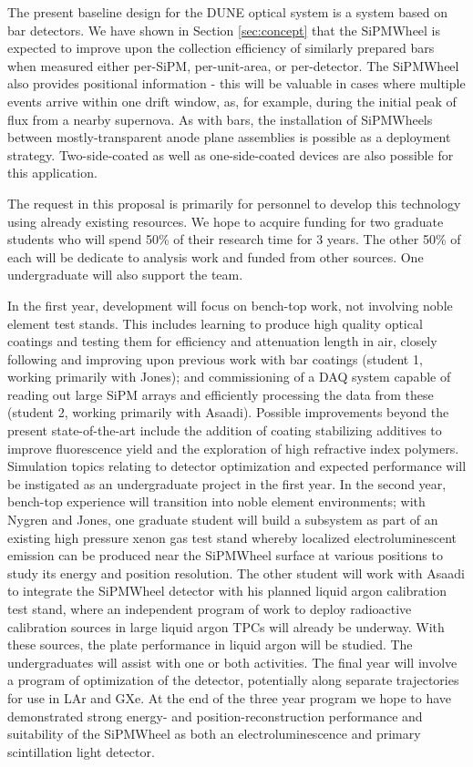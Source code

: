 The present baseline design for the DUNE optical system is a system based on bar detectors.  We have shown in Section \ref{sec:concept} that the SiPMWheel is expected to improve upon the collection efficiency of similarly prepared bars when measured either per-SiPM, per-unit-area, or per-detector.    The SiPMWheel also provides positional information - this will be valuable in cases where multiple events arrive within one drift window, as, for example, during the initial peak of flux from a nearby supernova.  As with bars, the installation of SiPMWheels between mostly-transparent anode plane assemblies is possible as a deployment strategy.   Two-side-coated as well as one-side-coated devices are also possible for this application.


The request in this proposal is primarily for personnel to develop this technology using already existing resources.  We hope to acquire funding for two graduate students who will spend 50\% of their research time for 3 years.  The other 50\% of each will be dedicate to analysis work and funded from other sources.   One undergraduate will also support the team.

In the first year, development will focus on bench-top work, not involving noble element test stands.   This includes learning to produce high quality optical coatings and testing them for efficiency and attenuation length in air, closely following and improving upon previous work with bar coatings (student 1, working primarily with Jones); and commissioning  of a DAQ system capable of reading out large SiPM arrays and efficiently processing the data from these (student 2, working primarily with Asaadi).  Possible improvements beyond the present state-of-the-art include the addition of coating stabilizing additives to improve fluorescence yield and the exploration of high refractive index polymers. Simulation topics relating to detector optimization and expected performance will be instigated as an undergraduate project in the first year.  In the second year, bench-top experience will transition into noble element environments;  with Nygren and Jones, one graduate student will build a subsystem as part of an existing high pressure xenon gas test stand whereby localized electroluminescent emission can be produced near the SiPMWheel surface at various positions to study its energy and position resolution.   The other student will work with Asaadi to integrate the SiPMWheel detector with his planned liquid argon calibration test stand, where an independent program of work to deploy radioactive calibration sources in large liquid argon TPCs will already be underway.  With these sources, the plate performance in liquid argon will be studied.  The undergraduates will assist with one or both activities.  The final year will involve a program of optimization of the detector, potentially along separate trajectories for use in LAr and GXe.  At the end of the three year program we hope to have demonstrated strong energy- and position-reconstruction performance and suitability of the SiPMWheel as both an electroluminescence and primary scintillation light detector.
